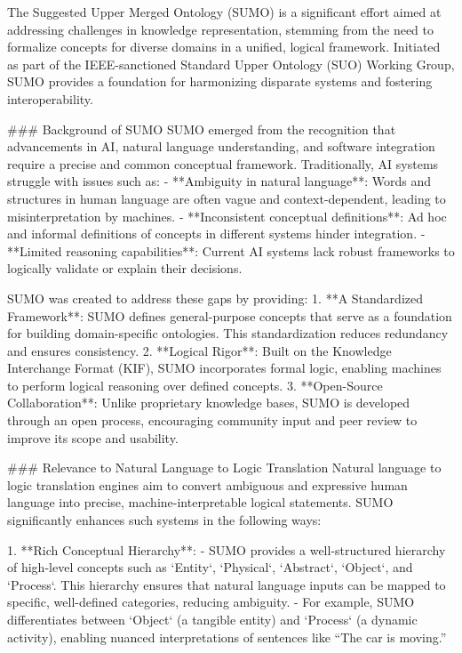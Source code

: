 The Suggested Upper Merged Ontology (SUMO) is a significant effort aimed at addressing challenges in knowledge representation, stemming from the need to formalize concepts for diverse domains in a unified, logical framework. Initiated as part of the IEEE-sanctioned Standard Upper Ontology (SUO) Working Group, SUMO provides a foundation for harmonizing disparate systems and fostering interoperability.

### Background of SUMO
SUMO emerged from the recognition that advancements in AI, natural language understanding, and software integration require a precise and common conceptual framework. Traditionally, AI systems struggle with issues such as:
- **Ambiguity in natural language**: Words and structures in human language are often vague and context-dependent, leading to misinterpretation by machines.
- **Inconsistent conceptual definitions**: Ad hoc and informal definitions of concepts in different systems hinder integration.
- **Limited reasoning capabilities**: Current AI systems lack robust frameworks to logically validate or explain their decisions.

SUMO was created to address these gaps by providing:
1. **A Standardized Framework**: SUMO defines general-purpose concepts that serve as a foundation for building domain-specific ontologies. This standardization reduces redundancy and ensures consistency.
2. **Logical Rigor**: Built on the Knowledge Interchange Format (KIF), SUMO incorporates formal logic, enabling machines to perform logical reasoning over defined concepts.
3. **Open-Source Collaboration**: Unlike proprietary knowledge bases, SUMO is developed through an open process, encouraging community input and peer review to improve its scope and usability.

### Relevance to Natural Language to Logic Translation
Natural language to logic translation engines aim to convert ambiguous and expressive human language into precise, machine-interpretable logical statements. SUMO significantly enhances such systems in the following ways:

1. **Rich Conceptual Hierarchy**:
   - SUMO provides a well-structured hierarchy of high-level concepts such as `Entity`, `Physical`, `Abstract`, `Object`, and `Process`. This hierarchy ensures that natural language inputs can be mapped to specific, well-defined categories, reducing ambiguity.
   - For example, SUMO differentiates between `Object` (a tangible entity) and `Process` (a dynamic activity), enabling nuanced interpretations of sentences like “The car is moving.”

